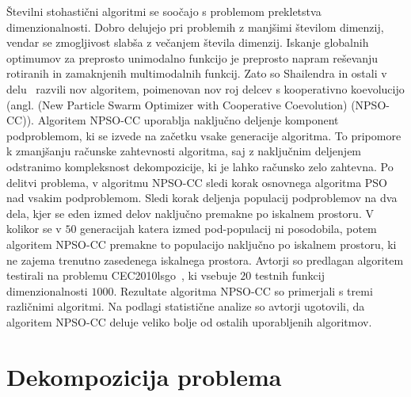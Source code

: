 Številni stohastični algoritmi se soočajo s problemom prekletstva dimenzionalnosti.
Dobro delujejo pri problemih z manjšimi številom dimenzij, vendar se zmogljivost slabša z večanjem števila dimenzij.
Iskanje globalnih optimumov za preprosto unimodalno funkcijo je preprosto napram reševanju rotiranih in zamaknjenih multimodalnih funkcij.
Zato so Shailendra in ostali v delu~\cite{alg:npscc} razvili nov algoritem, poimenovan nov roj delcev s kooperativno koevolucijo (angl. (New Particle Swarm Optimizer with Cooperative Coevolution) (NPSO-CC)).
Algoritem NPSO-CC uporablja naključno deljenje komponent podproblemom, ki se izvede na začetku vsake generacije algoritma.
To pripomore k zmanjšanju računske zahtevnosti algoritma, saj z naključnim deljenjem odstranimo kompleksnost dekompozicije, ki je lahko računsko zelo zahtevna.
Po delitvi problema, v algoritmu NPSO-CC sledi korak osnovnega algoritma PSO nad vsakim podproblemom.
Sledi korak deljenja populacij podproblemov na dva dela, kjer se eden izmed delov naključno premakne po iskalnem prostoru.
V kolikor se v $50$ generacijah katera izmed pod-populacij ni posodobila, potem algoritem NPSO-CC premakne to populacijo naključno po iskalnem prostoru, ki ne zajema trenutno zasedenega iskalnega prostora.
Avtorji so predlagan algoritem testirali na problemu CEC2010lsgo~\cite{bech:cec2010lsgo}, ki vsebuje $20$ testnih funkcij dimenzionalnosti $1000$.
Rezultate algoritma NPSO-CC so primerjali s tremi različnimi algoritmi.
Na podlagi statistične analize so avtorji ugotovili, da algoritem NPSO-CC deluje veliko bolje od ostalih uporabljenih algoritmov.

\section{Dekompozicija problema}

